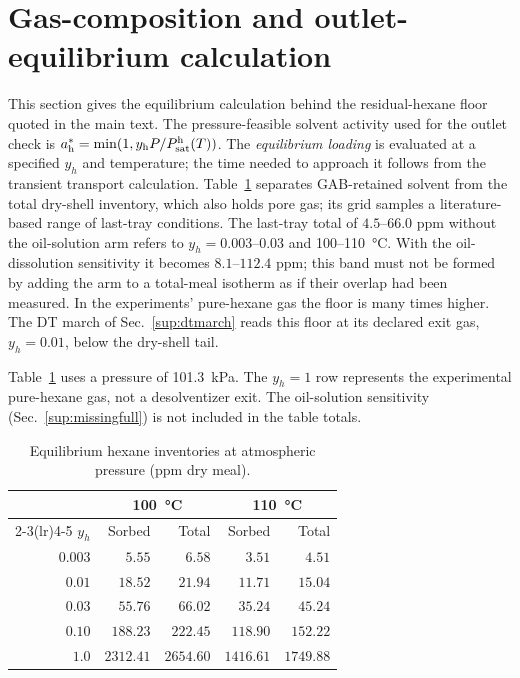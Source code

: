 \section{Gas-composition and outlet-equilibrium calculation}
\label{sup:evidence:outlet}\label{sup:evidence:checks}\label{sup:evidence:outstanding}
This section gives the equilibrium calculation behind the residual-hexane floor quoted in the main text. The pressure-feasible solvent activity used for the outlet check is $a_{\mathrm{h}}^{*}=\min(1,y_{\mathrm{h}} P/P_{\mathrm{sat}}^{\mathrm{h}}(T))$. The \emph{equilibrium loading} is evaluated at a specified $y_h$ and temperature; the time needed to approach it follows from the transient transport calculation. Table~\ref{tab:evidence:floor} separates GAB-retained solvent from the total dry-shell inventory, which also holds pore gas; its grid samples a literature-based range of last-tray conditions. The last-tray total of $4.5$--$66.0$ ppm without the oil-solution arm refers to $y_h=0.003$--$0.03$ and 100--\SI{110}{\celsius}. With the oil-dissolution sensitivity it becomes $8.1$--$112.4$ ppm; this band must not be formed by adding the arm to a total-meal isotherm as if their overlap had been measured. In the experiments' pure-hexane gas the floor is many times higher. The DT march of Sec.~\ref{sup:dtmarch} reads this floor at its declared exit gas, $y_h=0.01$, below the dry-shell tail.

Table~\ref{tab:evidence:floor} uses a pressure of \SI{101.3}{\kilo\pascal}.
The $y_h=1$ row represents the experimental pure-hexane gas, not
a desolventizer exit. The oil-solution sensitivity (Sec.~\ref{sup:missingfull})
is not included in the table totals.

\begin{table}[htbp]\centering\footnotesize
\caption{Equilibrium hexane inventories at atmospheric pressure (ppm dry meal).}
\label{tab:evidence:floor}
\begin{tabular}{@{}r rrrr@{}}\toprule
 & \multicolumn{2}{c}{\SI{100}{\celsius}} & \multicolumn{2}{c}{\SI{110}{\celsius}}\\
\cmidrule(lr){2-3}\cmidrule(lr){4-5}
$y_h$ & Sorbed & Total & Sorbed & Total\\\midrule
$0.003$ & $5.55$ & $6.58$ & $3.51$ & $4.51$\\
$0.01$ & $18.52$ & $21.94$ & $11.71$ & $15.04$\\
$0.03$ & $55.76$ & $66.02$ & $35.24$ & $45.24$\\
$0.10$ & $188.23$ & $222.45$ & $118.90$ & $152.22$\\
$1.0$ & $2312.41$ & $2654.60$ & $1416.61$ & $1749.88$\\
\bottomrule\end{tabular}\end{table}


